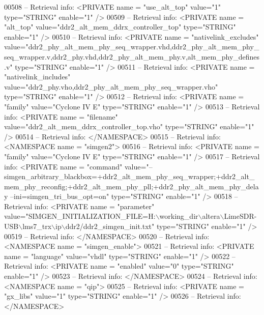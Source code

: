\begin{DoxyCode}
{00508 \textcolor{keyword}{-- Retrieval info:      <PRIVATE name = "use\_alt\_top" value="1"  type="STRING"  enable="1" />}
00509 \textcolor{keyword}{-- Retrieval info:      <PRIVATE name = "alt\_top" value="ddr2\_alt\_mem\_ddrx\_controller\_top"  type="STRING" 
       enable="1" />}
00510 \textcolor{keyword}{-- Retrieval info:      <PRIVATE name = "nativelink\_excludes"
       value="ddr2\_phy\_alt\_mem\_phy\_seq\_wrapper.vhd,ddr2\_phy\_alt\_mem\_phy\_seq\_wrapper.v,ddr2\_phy.vhd,ddr2\_phy\_alt\_mem\_phy.v,alt\_mem\_phy\_defines.v"  type="STRING" 
       enable="1" />}
00511 \textcolor{keyword}{-- Retrieval info:      <PRIVATE name = "nativelink\_includes"
       value="ddr2\_phy.vho,ddr2\_phy\_alt\_mem\_phy\_seq\_wrapper.vho"  type="STRING"  enable="1" />}
00512 \textcolor{keyword}{-- Retrieval info:      <PRIVATE name = "family" value="Cyclone IV E"  type="STRING"  enable="1" />}
00513 \textcolor{keyword}{-- Retrieval info:      <PRIVATE name = "filename" value="ddr2\_alt\_mem\_ddrx\_controller\_top.vho" 
       type="STRING"  enable="1" />}
00514 \textcolor{keyword}{-- Retrieval info:     </NAMESPACE>}
00515 \textcolor{keyword}{-- Retrieval info:     <NAMESPACE name = "simgen2">}
00516 \textcolor{keyword}{-- Retrieval info:      <PRIVATE name = "family" value="Cyclone IV E"  type="STRING"  enable="1" />}
00517 \textcolor{keyword}{-- Retrieval info:      <PRIVATE name = "command"
       value="--simgen\_arbitrary\_blackbox=+ddr2\_alt\_mem\_phy\_seq\_wrapper;+ddr2\_alt\_mem\_phy\_reconfig;+ddr2\_alt\_mem\_phy\_pll;+ddr2\_phy\_alt\_mem\_phy\_delay
       --ini=simgen\_tri\_bus\_opt=on"  type="STRING"  enable="1" />}
00518 \textcolor{keyword}{-- Retrieval info:      <PRIVATE name = "parameter"
       value="SIMGEN\_INITIALIZATION\_FILE=H:\(\backslash\)working\_dir\(\backslash\)altera\(\backslash\)LimeSDR-USB\(\backslash\)lms7\_trx\(\backslash\)ip\(\backslash\)ddr2/ddr2\_simgen\_init.txt"  type="STRING"  enable="1" />}
00519 \textcolor{keyword}{-- Retrieval info:     </NAMESPACE>}
00520 \textcolor{keyword}{-- Retrieval info:     <NAMESPACE name = "simgen\_enable">}
00521 \textcolor{keyword}{-- Retrieval info:      <PRIVATE name = "language" value="vhdl"  type="STRING"  enable="1" />}
00522 \textcolor{keyword}{-- Retrieval info:      <PRIVATE name = "enabled" value="0"  type="STRING"  enable="1" />}
00523 \textcolor{keyword}{-- Retrieval info:     </NAMESPACE>}
00524 \textcolor{keyword}{-- Retrieval info:     <NAMESPACE name = "qip">}
00525 \textcolor{keyword}{-- Retrieval info:      <PRIVATE name = "gx\_libs" value="1"  type="STRING"  enable="1" />}
00526 \textcolor{keyword}{-- Retrieval info:     </NAMESPACE>}
}
\end{DoxyCode}
